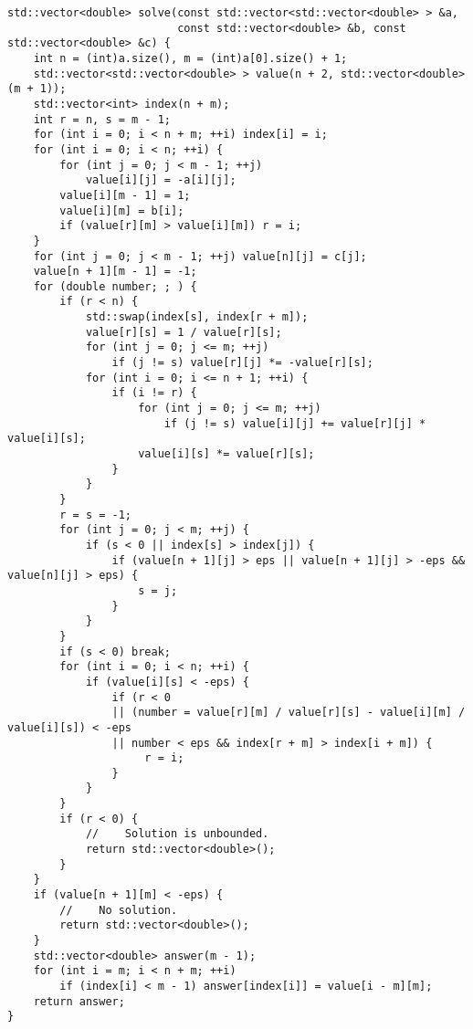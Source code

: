 \begin{lstlisting}
std::vector<double> solve(const std::vector<std::vector<double> > &a, 
                          const std::vector<double> &b, const std::vector<double> &c) {
    int n = (int)a.size(), m = (int)a[0].size() + 1;
    std::vector<std::vector<double> > value(n + 2, std::vector<double>(m + 1));
    std::vector<int> index(n + m);
    int r = n, s = m - 1;
    for (int i = 0; i < n + m; ++i) index[i] = i;
    for (int i = 0; i < n; ++i) {
        for (int j = 0; j < m - 1; ++j)
            value[i][j] = -a[i][j];
        value[i][m - 1] = 1;
        value[i][m] = b[i];
        if (value[r][m] > value[i][m]) r = i;
    }
    for (int j = 0; j < m - 1; ++j) value[n][j] = c[j];
    value[n + 1][m - 1] = -1;
    for (double number; ; ) {
        if (r < n) {
            std::swap(index[s], index[r + m]);
            value[r][s] = 1 / value[r][s];
            for (int j = 0; j <= m; ++j)
                if (j != s) value[r][j] *= -value[r][s];
            for (int i = 0; i <= n + 1; ++i) {
                if (i != r) {
                    for (int j = 0; j <= m; ++j)
                        if (j != s) value[i][j] += value[r][j] * value[i][s];
                    value[i][s] *= value[r][s];
                }
            }
        }
        r = s = -1;
        for (int j = 0; j < m; ++j) {
            if (s < 0 || index[s] > index[j]) {
                if (value[n + 1][j] > eps || value[n + 1][j] > -eps && value[n][j] > eps) {
                    s = j;
                }
            }
        }
        if (s < 0) break;
        for (int i = 0; i < n; ++i) {
            if (value[i][s] < -eps) {
                if (r < 0
                || (number = value[r][m] / value[r][s] - value[i][m] / value[i][s]) < -eps
                || number < eps && index[r + m] > index[i + m]) {
                     r = i;
                }
            }
        }
        if (r < 0) {
            //    Solution is unbounded.
            return std::vector<double>();
        }
    }
    if (value[n + 1][m] < -eps) {
        //    No solution.
        return std::vector<double>();
    }
    std::vector<double> answer(m - 1);
    for (int i = m; i < n + m; ++i)
        if (index[i] < m - 1) answer[index[i]] = value[i - m][m];
    return answer;
}
\end{lstlisting}
